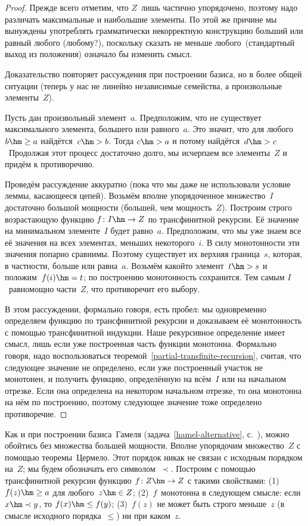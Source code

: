 \begin{proof}
Прежде всего отметим, что $Z$~лишь частично упорядочено, поэтому
надо различать максимальные и наибольшие элементы. По этой же
причине мы вынуждены употреблять грамматически некорректную
конструкцию  больший или равный любого (любому?), поскольку
сказать  не меньше любого\ (стандартный выход из
положения) означало бы изменить смысл.

Доказательство повторяет рассуждения при построении базиса,
но в более общей ситуации (теперь у нас не линейно независимые
семейства, а произвольные элементы~$Z$).

Пусть дан произвольный элемент~$a$. Предположим, что не существует
максимального элемента, большего или равного~$a$. Это значит,
что для любого~$b\hm\ge a$ найдётся~$c\hm>b$. Тогда $c\hm>a$ и потому
найдётся~$d\hm>c$~ Продолжая этот процесс достаточно долго, мы исчерпаем
все элементы~$Z$ и придём к противоречию.

Проведём рассуждение аккуратно (пока что мы даже не использовали
условие леммы, касающееся цепей).
Возьмём вполне упорядоченное множество~$I$ достаточно
большой мощности (большей, чем мощность~$Z$).
Построим строго возрастающую функцию $f\colon I\hm\to Z$ по
трансфинитной рекурсии. Её значение на минимальном элементе~$I$
будет равно~$a$. Предположим, что мы уже знаем все её значения
на всех элементах, меньших некоторого~$i$. В силу монотонности
эти значения попарно сравнимы. Поэтому существует их верхняя
граница~$s$, которая, в частности, больше или равна~$a$. Возьмём
какой\д то элемент~$t\hm>s$ и положим~$f(i)\hm=t$; по построению
монотонность сохранится. Тем самым $I$~равномощно части~$Z$, что
противоречит его выбору.

В этом рассуждении, формально говоря, есть пробел: мы
одновременно определяем функцию по трансфинитной рекурсии и
доказываем её монотонность с помощью трансфинитной индукции.
Наше рекурсивное определение имеет смысл, лишь если уже
построенная часть функции монотонна. Формально говоря, надо
воспользоваться теоремой~\ref{partial-transfinite-recursion},
считая, что следующее значение не определено, если уже
построенный участок не монотонен, и получить функцию,
определённую на всём~$I$ или на начальном отрезке. Если она
определена на некотором начальном отрезке, то она монотонна на
нём по построению, поэтому следующее значение тоже определено\т
противоречие.
\end{proof}

Как и при построении базиса~Гамеля
(задача~\ref{hamel-alternative},
с.~\pageref{hamel-alternative}), можно обойтись без множества большей
мощности. Вполне упорядочим множество~$Z$ с помощью теоремы~Цермело.
Этот порядок никак не связан с исходным порядком на~$Z$; мы будем обозначать
его символом~$\prec$. Построим с помощью трансфинитной рекурсии
функцию $f\colon Z \hm\to Z$ с такими свойствами:
(1)~$f(z) \hm\ge a$ для любого~$z\hm\in Z$;
(2)~$f$~монотонна в следующем смысле: если $x\hm\prec y$, то
$f(x)\hm\le f(y)$;
(3)~$f(z)$ не может быть строго меньше~$z$ (в смысле исходного порядка~$\le$)
ни при каком~$z$.


